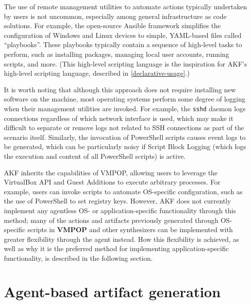 \documentclass[letterpaper,12pt]{report}
\newcommand{\passthrough}[1]{#1}
\begin{document}
The use of remote management utilities to automate actions typically
undertaken by users is not uncommon, especially among general
infrastructure as code solutions. For example, the open-source Ansible
framework simplifies the configuration of Windows and Linux devices to
simple, YAML-based files called ``playbooks''. These playbooks typically
contain a sequence of high-level tasks to perform, such as installing
packages, managing local user accounts, running scripts, and more. (This
high-level scripting language is the inspiration for AKF's high-level
scripting language, described in \autoref{declarative-usage}.)

It is worth noting that although this approach does not require
installing new software on the machine, most operating systems perform
some degree of logging when their management utilities are invoked. For
example, the \passthrough{\lstinline!sshd!} daemon logs connections
regardless of which network interface is used, which may make it
difficult to separate or remove logs not related to SSH connections as
part of the scenario itself. Similarly, the invocation of PowerShell
scripts causes event logs to be generated, which can be particularly
noisy if Script Block Logging (which logs the execution and content of
all PowerShell scripts) is active.

AKF inherits the capabilities of VMPOP, allowing users to leverage the
VirtualBox API and Guest Additions to execute arbitrary processes. For
example, users can invoke scripts to automate OS-specific configuration,
such as the use of PowerShell to set registry keys. However, AKF does
not currently implement any agentless OS- or application-specific
functionality through this method; many of the actions and artifacts
previously generated through OS-specific scripts in \textbf{VMPOP} and
other synthesizers can be implemented with greater flexibility through
the agent instead. How this flexibility is achieved, as well as why it
is the preferred method for implementing application-specific
functionality, is described in the following section.

\section{Agent-based artifact
generation}\label{agent-based-artifact-generation}
\end{document}
